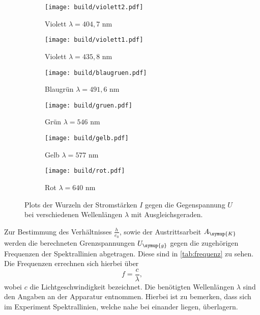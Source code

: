 \begin{figure}
  \begin{subfigure}{0.49\textwidth}
    \centering
    \texttt{[image: build/violett2.pdf]}
    \caption{Violett $\lambda = 404,7$ nm}
  \end{subfigure}
  \begin{subfigure}{0.49\textwidth}
    \centering
    \texttt{[image: build/violett1.pdf]}
    \caption{Violett $\lambda = 435,8$ nm}
  \end{subfigure}

  \centering
  \begin{subfigure}{0.49\textwidth}
    \centering
    \texttt{[image: build/blaugruen.pdf]}
    \caption{Blaugrün $\lambda = 491,6$ nm}
  \end{subfigure}
  \begin{subfigure}{0.49\textwidth}
    \centering
    \texttt{[image: build/gruen.pdf]}
    \caption{Grün $\lambda = 546$ nm}
  \end{subfigure}

  \begin{subfigure}{0.49\textwidth}
    \centering
    \texttt{[image: build/gelb.pdf]}
    \caption{Gelb $\lambda = 577$ nm}
  \end{subfigure}
  \begin{subfigure}{0.49\textwidth}
    \centering
    \texttt{[image: build/rot.pdf]}
    \caption{Rot $\lambda = 640$ nm}
  \end{subfigure}

  \caption{Plots der Wurzeln der Stromstärken $I$ gegen die Gegenspannung $U$ bei verschiedenen Wellenlängen $\lambda$ mit Ausgleichsgeraden.}
  \label{fig:farben}
\end{figure}


Zur Bestimmung des Verhältnisses $\frac{h}{e_0}$, sowie der Austrittsarbeit $A_{\symup{K}}$ werden die berechneten Grenzspannungen $U_{\symup{g}}$
gegen die zugehörigen Frequenzen der Spektrallinien abgetragen. Diese sind in \autoref{tab:frequenz} zu sehen. Die Frequenzen errechnen sich hierbei über 
\begin{equation}
\label{eqn:frequenz}
  f = \frac{c}{\lambda},
\end{equation}  
wobei $c$ die Lichtgeschwindigkeit bezeichnet. Die benötigten Wellenlängen $\lambda$ sind den Angaben an der Apparatur entnommen. Hierbei ist zu bemerken, dass sich im Experiment Spektrallinien, welche nahe bei einander liegen, überlagern.
